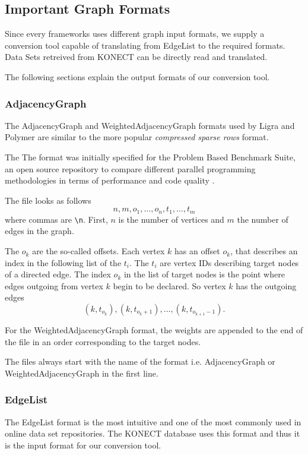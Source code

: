 
\subsection{Important Graph Formats}
Since every frameworks uses different graph input formats, we supply a conversion tool capable of translating from EdgeList to the required formats.
Data Sets retreived from KONECT can be directly read and translated.

The following sections explain the output formats of our conversion tool.
\subsubsection{AdjacencyGraph}
The AdjacencyGraph and WeightedAdjacencyGraph formats used by Ligra and Polymer are similar to the more popular \emph{compressed sparse rows} format.

The  The format was initially specified for the Problem Based Benchmark Suite, an open source repository to compare different parallel programming methodologies in terms of performance and code quality \cite{pbbs}.

The file looks as follows
\begin{equation*}
	n, m, o_1, \ldots, o_n, t_1, \ldots, t_m
\end{equation*}
where commas are \texttt{\textbackslash n}. First, $n$ is the number of vertices and $m$ the number of edges in the graph.

The $o_k$ are the so-called offsets. Each vertex $k$ has an offset $o_k$, that describes an index in the following list of the $t_i$.
The $t_i$ are vertex IDs describing target nodes of a directed edge. 
The index $o_k$ in the list of target nodes is the point where edges outgoing from vertex $k$ begin to be declared. So vertex $k$ has the outgoing edges
\begin{equation*}
	(k, t_{o_k}), (k, t_{o_k+1}),\ldots, (k, t_{o_{k+1}-1}).
\end{equation*}

For the WeightedAdjacencyGraph format, the weights are appended to the end of the file in an order corresponding to the target nodes.

The files always start with the name of the format i.e. AdjacencyGraph or WeightedAdjacencyGraph in the first line.

\subsubsection{EdgeList}
The EdgeList format is the most intuitive and one of the most commonly used in online data set repositories. The KONECT database uses this format and thus it is the input format for our conversion tool.

